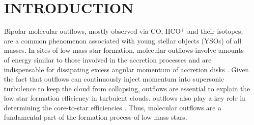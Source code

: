 \section{INTRODUCTION}
Bipolar molecular outflows, mostly observed via CO, HCO$^+$ and their isotopes, are a common phenomenon associated with young stellar objects (YSOs) of all masses\citep{ 1985ARA&A..23..267L,1993prpl.conf..603F, 2001ApJ...552L.167Z,2002A&A...383..892B, 2004A&A...426..503W, 2005AJ....129..330W,  2015MNRAS.453..645M}. In sites of low-mass star formation, molecular outflows involve amounts of energy similar to those involved in the accretion processes and are indispensable for dissipating excess angular momentum of accretion disks \citep{1987ARA&A..25...23S, 1996ARA&A..34..111B}. Given the fact that outflows can continuously inject momentum into supersonic turbulence to keep the cloud from collapsing, outflows are essential to explain the low star formation efficiency in turbulent clouds. outflows also play a key role in determining the core-to-star efficiencies \citep{2014prpl.conf..451F}. Thus, molecular outflows are a fundamental part of the formation process of low mass stars. 

